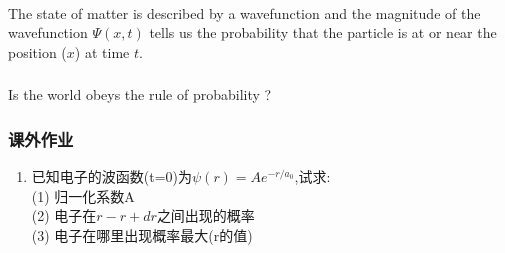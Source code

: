 \begin{frame}  
    \begin{tcolorbox3}[Conclusion]
        ~~\\
       {The state of matter is described by a wavefunction and the magnitude of the wavefunction $ \Psi(x,t)$ 
       tells us the probability that the particle is at or near the position ($x$) at time $t$.}
    \end{tcolorbox3} 
\end{frame} 

\begin{frame}
    \frametitle{}
    \centering
    {
    {Is the world obeys the rule of probability ?}
    }
\end{frame}
 \begin{frame}
     \frametitle{课外作业}
     \begin{enumerate}
        \item 已知电子的波函数(t=0)为$\psi(r)=Ae^{-r/a_0} $,试求:\\
               (1) 归一化系数A \\
               (2) 电子在$r-r+dr$之间出现的概率\\
               (3) 电子在哪里出现概率最大(r的值)
     \end{enumerate}
 \end{frame}

